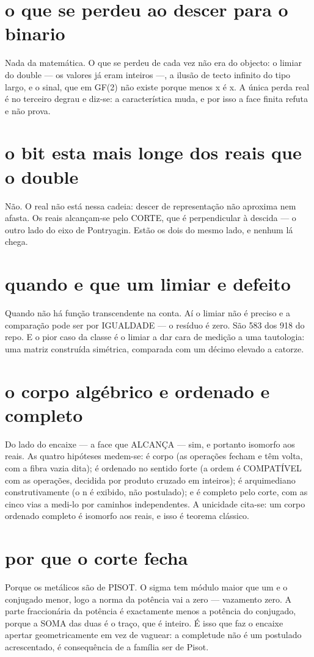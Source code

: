\documentclass[11pt,a4paper]{article}
\begin{document}
\section{o que se perdeu ao descer para o binario}
Nada da matemática. O que se perdeu de cada vez não era do objecto: o limiar do double —
os valores já eram inteiros —, a ilusão de tecto infinito do tipo largo, e o sinal, que em
GF(2) não existe porque menos x é x. A única perda real é no terceiro degrau e diz-se: a
característica muda, e por isso a face finita refuta e não prova.

\section{o bit esta mais longe dos reais que o double}
Não. O real não está nessa cadeia: descer de representação não aproxima nem afasta. Os
reais alcançam-se pelo CORTE, que é perpendicular à descida — o outro lado do eixo de
Pontryagin. Estão os dois do mesmo lado, e nenhum lá chega.

\section{quando e que um limiar e defeito}
Quando não há função transcendente na conta. Aí o limiar não é preciso e a comparação pode
ser por IGUALDADE — o resíduo é zero. São 583 dos 918 do repo. E o pior caso da classe é o
limiar a dar cara de medição a uma tautologia: uma matriz construída simétrica, comparada
com um décimo elevado a catorze.

\section{o corpo algébrico e ordenado e completo}
Do lado do encaixe — a face que ALCANÇA — sim, e portanto isomorfo aos reais. As quatro
hipóteses medem-se: é corpo (as operações fecham e têm volta, com a fibra vazia dita); é
ordenado no sentido forte (a ordem é COMPATÍVEL com as operações, decidida por produto
cruzado em inteiros); é arquimediano construtivamente (o n é exibido, não postulado); e é
completo pelo corte, com as cinco vias a medi-lo por caminhos independentes. A unicidade
cita-se: um corpo ordenado completo é isomorfo aos reais, e isso é teorema clássico.

\section{por que o corte fecha}
Porque os metálicos são de PISOT. O sigma tem módulo maior que um e o conjugado menor, logo
a norma da potência vai a zero — vazamento zero. A parte fraccionária da potência é
exactamente menos a potência do conjugado, porque a SOMA das duas é o traço, que é inteiro.
É isso que faz o encaixe apertar geometricamente em vez de vaguear: a completude não é um
postulado acrescentado, é consequência de a família ser de Pisot.
\end{document}
